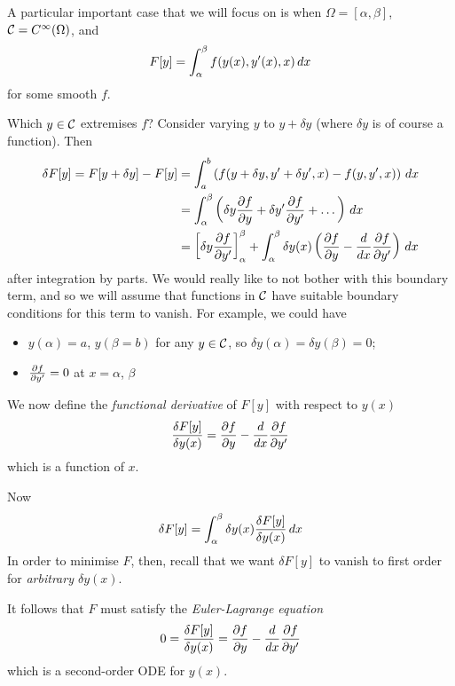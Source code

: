 \documentclass{../../template/note}
\begin{document}
    A particular important case that we will focus on is when $\Omega = [\alpha, \beta]$, $\mathcal{C} = C^\infty(\Omega)$, and
    \begin{align*}
        F[y] = \int_\alpha^\beta f(y(x), y'(x), x) \,d{x}
    \end{align*}
    for some smooth $f$.

    Which $y \in \mathcal{C}$ extremises $f$? Consider varying $y$ to $y + \delta y$ (where $\delta y$ is of course a function). Then
    \begin{align*}
        \delta F[y] = F[y+\delta y] - F[y] &= \int_a^b \left(f(y+\delta y, y'+\delta y', x) - f(y, y', x)\right) \D x \\
        &= \int_\alpha^\beta \left(\delta y \pd{f}{y} + \delta y' \pd{f}{y'} + \dots\right) \D x \\
        &= \left[\delta y \pd{f}{y'}\right]_\alpha^\beta + \int_\alpha^\beta \delta y(x) \left(\pd{f}{y} - \frac{d}{dx} \pd{f}{y'}\right) \D x
    \end{align*}
    after integration by parts. We would really like to not bother with this boundary term, and so we will assume that functions in $\mathcal{C}$ have suitable boundary conditions for this term to vanish. For example, we could have
    \begin{itemize}
        \item $y(\alpha) = a$, $y(\beta = b)$ for any $y \in \mathcal{C}$, so $\delta y(\alpha) = \delta y(\beta) = 0$;
        \item $\pd{f}{y'} = 0$ at $x = \alpha$, $\beta$
    \end{itemize}

    \begin{definition}
        We now define the \emph{functional derivative} of $F[y]$ with respect to $y(x)$
        \begin{align*}
            \frac{\delta F[y]}{\delta y(x)} = \pd{f}{y} - \frac{d}{dx} \pd{f}{y'}
        \end{align*}
        which is a function of $x$.
    \end{definition}
    
    Now
    \begin{align*}
        \delta F[y] = \int_\alpha^\beta \delta y(x) \frac{\delta F[y]}{\delta y(x)} \,d{x}
    \end{align*}
    In order to minimise $F$, then, recall that we want $\delta F[y]$ to vanish to first order for \emph{arbitrary $\delta y(x)$}.

    \begin{theorem}    
        It follows that $F$ must satisfy the \emph{Euler-Lagrange equation}
        \begin{align*}
            0 = \frac{\delta F[y]}{\delta y(x)} = \pd{f}{y} - \frac{d}{dx} \pd{f}{y'}
        \end{align*}  
        which is a second-order ODE for $y(x)$.        
    \end{theorem}   
\end{document}

